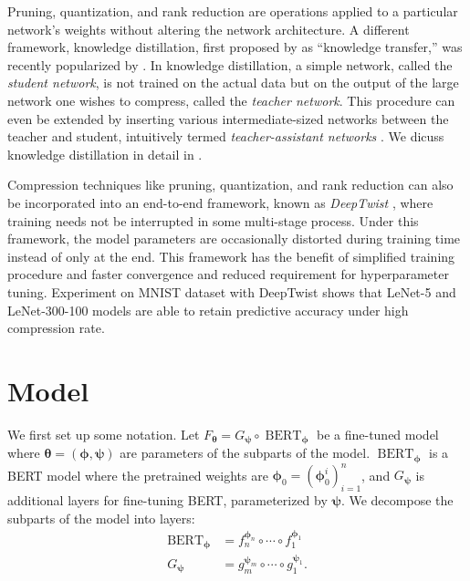 \documentclass[10pt]{article}
\newcommand{\bert}{\operatorname{BERT}}
\newcommand{\btheta}{{\bm{\theta}}}
\newcommand{\bphi}{{\bm{\phi}}}
\newcommand{\bpsi}{{\bm{\psi}}}
\begin{document}
Pruning, quantization, and rank reduction are operations applied to a
particular network's weights without altering the network architecture. 
A different framework, knowledge distillation, first proposed by 
\citet{bucilua2006model} as
``knowledge transfer,'' was recently popularized by
\citet{hinton2015distilling}. In knowledge distillation, a simple network,
called the \emph{student network}, is not trained on the actual data but on
the output of the large network one wishes to compress, called the 
\emph{teacher network}. This procedure can even be extended by inserting
various
intermediate-sized networks between the teacher and student, intuitively
termed
\emph{teacher-assistant networks} \citep{mirzadeh2019improved}. We dicuss
knowledge distillation in detail in .


Compression techniques like pruning, quantization, and rank reduction can
also be incorporated into an end-to-end framework, known as 
\emph{DeepTwist}  \citep{lee2018deeptwist}, where training needs not be
interrupted in some multi-stage process. Under this
framework, the model parameters are occasionally distorted during training
time instead of only at the end. This framework has the benefit of simplified
training procedure and faster convergence and reduced requirement for
hyperparameter tuning. Experiment on MNIST dataset with DeepTwist shows that
LeNet-5 and LeNet-300-100 models are able to retain predictive accuracy under
high compression rate.



\section{Model}
\label{sec:model}

We first set up some notation. Let $F_\btheta = G_\bpsi \circ \bert_\bphi$ be
a fine-tuned model where $\btheta = (\bphi, \bpsi)$ are parameters of the
subparts of the model. $\bert_\bphi$ is a BERT model where the pretrained
weights are $\bphi_0 = (\bphi_0^i)_{i=1}^n$, and $G_\bpsi$ is additional
layers for fine-tuning BERT, parameterized by $\bpsi$. We decompose the
subparts of the model into layers: \begin{align*}
\bert_\bphi &= f_{n}^{\bphi_n} \circ \cdots \circ f_1^{\bphi_1} \\
G_\bpsi &= g_{m}^{\bpsi_m} \circ \cdots \circ g_1^{\bpsi_1}.
\end{align*}

\end{document}
